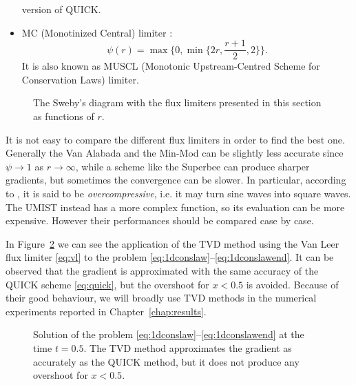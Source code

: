 \begin{itemize}
	version of QUICK.
%
	\item MC (Monotinized Central) limiter \cite{tvd:mclimiter}:
	\begin{equation} \label{eq:mclim}
	\psi(r)=\max \bigg\{0, \min \bigg\{ 2r, \frac{r+1}{2}, 2\bigg\} \bigg\}.
	\end{equation}
	It is also known as MUSCL (Monotonic Upstream-Centred Scheme for 
	Conservation Laws) limiter.
%	
\end{itemize}
\begin{figure}[t]
	\centering
	
	\caption[Flux limiter functions]{The Sweby's diagram with the flux limiters 
	presented in this section as functions of $r$.}
	\label{fig:fluxlimiters}
\end{figure}

It is not easy to compare the different flux limiters in order to find the 
best one. Generally the Van Alabada and the Min-Mod can be slightly less accurate 
since $\psi \rightarrow 1$ as $r \rightarrow \infty$, while a scheme like the 
Superbee can produce sharper gradients, but sometimes the convergence can be slower. In particular, according to \cite{tvd:sweeby}, it is said to be \emph{overcompressive}, i.e. it may turn sine waves into square waves. The UMIST instead has a 
more complex function, so its evaluation can be more expensive. However their 
performances should be compared case by case.

In Figure~\ref{fig:1dconslawtvd} we can see the application of the TVD method 
using the Van Leer flux limiter \eqref{eq:vl} to the problem 
\eqref{eq:1dconslaw}--\eqref{eq:1dconslawend}. It can be observed that the 
gradient is approximated with the same accuracy of the QUICK scheme 
\eqref{eq:quick}, but the overshoot for $x<0.5$ is avoided. Because of their 
good behaviour, we will broadly use TVD methods in the numerical experiments 
reported in Chapter~\ref{chap:results}.
\begin{figure}
	\centering
	
	\caption[Solution of a one-dimensional scalar conservation law using a TVD 
	method]{Solution of the problem 
	\eqref{eq:1dconslaw}--\eqref{eq:1dconslawend} at the time 
	$t=0.5$. The TVD method approximates the gradient as accurately as the 
	QUICK method, but it does not produce any overshoot for $x<0.5$.}
	\label{fig:1dconslawtvd}
\end{figure}
%
